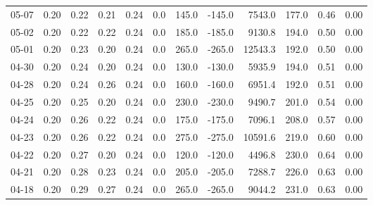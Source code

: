 \begin{threeparttable}
{\begin{tabular}{lrrrrrrrrrrr}
  05-07 &          0.20 &          0.22 &          0.21 &        0.24 &                 0.0 &               145.0 &     -145.0 &              7543.0 &            177.0 &            0.46 &                   0.00 \\
  05-02 &          0.20 &          0.22 &          0.22 &        0.24 &                 0.0 &               185.0 &     -185.0 &              9130.8 &            194.0 &            0.50 &                   0.00 \\
  05-01 &          0.20 &          0.23 &          0.20 &        0.24 &                 0.0 &               265.0 &     -265.0 &             12543.3 &            192.0 &            0.50 &                   0.00 \\
  04-30 &          0.20 &          0.24 &          0.20 &        0.24 &                 0.0 &               130.0 &     -130.0 &              5935.9 &            194.0 &            0.51 &                   0.00 \\
  04-28 &          0.20 &          0.24 &          0.26 &        0.24 &                 0.0 &               160.0 &     -160.0 &              6951.4 &            192.0 &            0.51 &                   0.00 \\
  04-25 &          0.20 &          0.25 &          0.20 &        0.24 &                 0.0 &               230.0 &     -230.0 &              9490.7 &            201.0 &            0.54 &                   0.00 \\
  04-24 &          0.20 &          0.26 &          0.22 &        0.24 &                 0.0 &               175.0 &     -175.0 &              7096.1 &            208.0 &            0.57 &                   0.00 \\
  04-23 &          0.20 &          0.26 &          0.22 &        0.24 &                 0.0 &               275.0 &     -275.0 &             10591.6 &            219.0 &            0.60 &                   0.00 \\
  04-22 &          0.20 &          0.27 &          0.20 &        0.24 &                 0.0 &               120.0 &     -120.0 &              4496.8 &            230.0 &            0.64 &                   0.00 \\
  04-21 &          0.20 &          0.28 &          0.23 &        0.24 &                 0.0 &               205.0 &     -205.0 &              7288.7 &            226.0 &            0.63 &                   0.00 \\
  04-18 &          0.20 &          0.29 &          0.27 &        0.24 &                 0.0 &               265.0 &     -265.0 &              9044.2 &            231.0 &            0.63 &                   0.00 \\

\end{tabular}}
\end{threeparttable}
